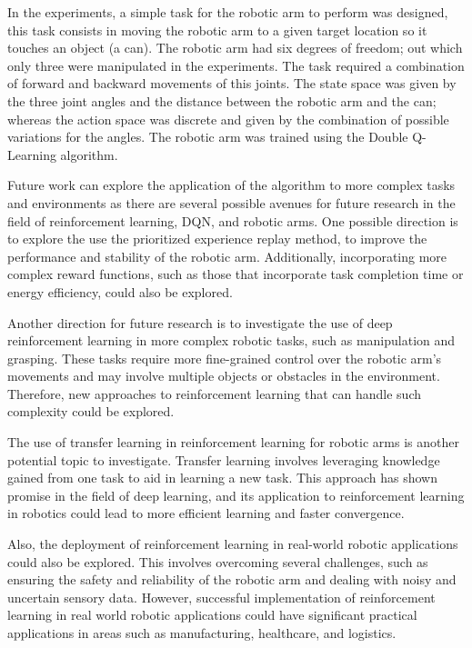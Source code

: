 \documentclass[12pt,oneside]{article}
\begin{document}
In the experiments, a simple task for the robotic arm to perform was designed, this task consists in moving the robotic arm to a given target location so it touches an object (a can). The robotic arm had six degrees of freedom; out which only three were manipulated in the experiments. The task required a combination of forward and backward movements of this joints. The state space was given by the three joint angles and the distance between the robotic arm and the can; whereas the action space was discrete and given by the combination of possible variations for the angles. The robotic arm was trained using the Double Q-Learning algorithm.

Future work can explore the application of the algorithm to more complex tasks and environments as there are several possible avenues for future research in the field of reinforcement learning, DQN, and robotic arms. One possible direction is to explore the use the prioritized experience replay method, to improve the performance and stability of the robotic arm. Additionally, incorporating more complex reward functions, such as those that incorporate task completion time or energy efficiency, could also be explored.

Another direction for future research is to investigate the use of deep reinforcement learning in more complex robotic tasks, such as manipulation and grasping. These tasks require more fine-grained control over the robotic arm's movements and may involve multiple objects or obstacles in the environment. Therefore, new approaches to reinforcement learning that can handle such complexity could be explored.

The use of transfer learning in reinforcement learning for robotic arms is another potential topic to investigate. Transfer learning involves leveraging knowledge gained from one task to aid in learning a new task. This approach has shown promise in the field of deep learning, and its application to reinforcement learning in robotics could lead to more efficient learning and faster convergence.

Also, the deployment of reinforcement learning in real-world robotic applications could also be explored. This involves overcoming several challenges, such as ensuring the safety and reliability of the robotic arm and dealing with noisy and uncertain sensory data. However, successful implementation of reinforcement learning in real world robotic applications could have significant practical applications in areas such as manufacturing, healthcare, and logistics.
\end{document}
